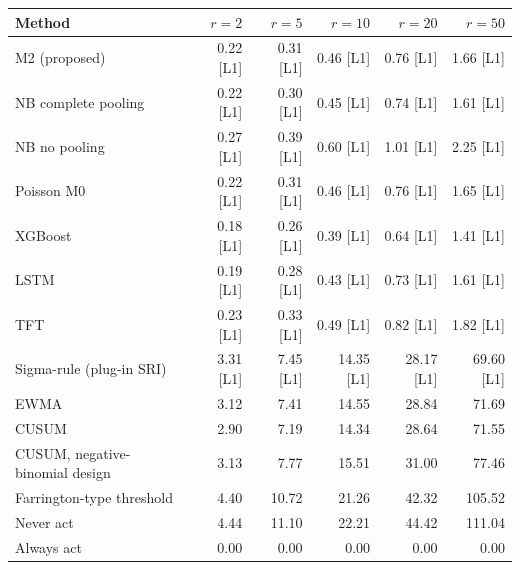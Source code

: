 \noindent\begin{minipage}{\linewidth}
\label{tab:S22}
\centering\scriptsize
\begin{tabular}{lrrrrr}
\toprule
Method & $r = 2$ & $r = 5$ & $r = 10$ & $r = 20$ & $r = 50$ \\ \midrule
M2 (proposed) & 0.22 [L1] & 0.31 [L1] & 0.46 [L1] & 0.76 [L1] & 1.66 [L1] \\
NB complete pooling & 0.22 [L1] & 0.30 [L1] & 0.45 [L1] & 0.74 [L1] & 1.61 [L1] \\
NB no pooling & 0.27 [L1] & 0.39 [L1] & 0.60 [L1] & 1.01 [L1] & 2.25 [L1] \\
Poisson M0 & 0.22 [L1] & 0.31 [L1] & 0.46 [L1] & 0.76 [L1] & 1.65 [L1] \\
XGBoost & 0.18 [L1] & 0.26 [L1] & 0.39 [L1] & 0.64 [L1] & 1.41 [L1] \\
LSTM & 0.19 [L1] & 0.28 [L1] & 0.43 [L1] & 0.73 [L1] & 1.61 [L1] \\
TFT & 0.23 [L1] & 0.33 [L1] & 0.49 [L1] & 0.82 [L1] & 1.82 [L1] \\
Sigma-rule (plug-in SRI) & 3.31 [L1] & 7.45 [L1] & 14.35 [L1] & 28.17 [L1] & 69.60 [L1] \\
EWMA & 3.12 & 7.41 & 14.55 & 28.84 & 71.69 \\
CUSUM & 2.90 & 7.19 & 14.34 & 28.64 & 71.55 \\
CUSUM, negative-binomial design & 3.13 & 7.77 & 15.51 & 31.00 & 77.46 \\
Farrington-type threshold & 4.40 & 10.72 & 21.26 & 42.32 & 105.52 \\
Never act & 4.44 & 11.10 & 22.21 & 44.42 & 111.04 \\
Always act & 0.00 & 0.00 & 0.00 & 0.00 & 0.00 \\
\bottomrule
\end{tabular}
\end{minipage}
\vspace{14pt}

